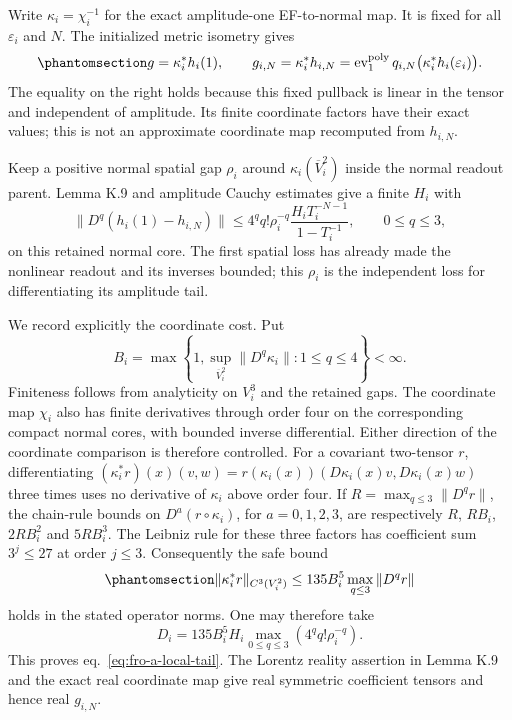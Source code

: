 \documentclass[
  english,
  11pt,
  reqno]{amsart}
\begin{document}
Write \(\kappa_i=\chi_i^{-1}\) for the exact amplitude-one EF-to-normal
map. It is fixed for all \(\varepsilon_i\) and \(N\). The initialized
metric isometry gives
\begin{equation}\protect\phantomsection\label{eq:fro-a-fixed-coordinate-readout}{
 g=\kappa_i^*h_i(1),\qquad
 g_{i,N}
   =\kappa_i^*h_{i,N}
   =\operatorname{ev}^{\mathrm{poly}}_1
                      q_{i,N}\bigl(\kappa_i^*h_i(\varepsilon_i)\bigr).
}\end{equation} The equality on the right holds because this fixed
pullback is linear in the tensor and independent of amplitude. Its
finite coordinate factors have their exact values; this is not an
approximate coordinate map recomputed from \(h_{i,N}\).

Keep a positive normal spatial gap \(\rho_i\) around
\(\kappa_i(\overline V_i^2)\) inside the normal readout parent. Lemma
K.9 and amplitude Cauchy estimates give a finite \(H_i\) with \[
 \|D^q(h_i(1)-h_{i,N})\|
 \le 4^q q!\rho_i^{-q}
                  \frac{H_iT_i^{-N-1}}{1-T_i^{-1}},
 \qquad 0\le q\le3,
\] on this retained normal core. The first spatial loss has already made
the nonlinear readout and its inverses bounded; this \(\rho_i\) is the
independent loss for differentiating its amplitude tail.

We record explicitly the coordinate cost. Put \[
 B_i=\max\left\{1,\sup_{\overline V_i^2}
                           \|D^q\kappa_i\|:1\le q\le4\right\}<\infty.
\] Finiteness follows from analyticity on \(V_i^3\) and the retained
gaps. The coordinate map \(\chi_i\) also has finite derivatives through
order four on the corresponding compact normal cores, with bounded
inverse differential. Either direction of the coordinate comparison is
therefore controlled. For a covariant two-tensor \(r\), differentiating
\((\kappa_i^*r)(x)(v,w)
=r(\kappa_i(x))(D\kappa_i(x)v,D\kappa_i(x)w)\) three times uses no
derivative of \(\kappa_i\) above order four. If
\(R=\max_{q\le3}\|D^qr\|\), the chain-rule bounds on
\(D^a(r\circ\kappa_i)\), for \(a=0,1,2,3\), are respectively \(R\),
\(RB_i\), \(2RB_i^2\) and \(5RB_i^3\). The Leibniz rule for these three
factors has coefficient sum \(3^j\le27\) at order \(j\le3\).
Consequently the safe bound
\begin{equation}\protect\phantomsection\label{eq:fro-a-coordinate-c4-cost}{
 \|\kappa_i^*r\|_{C^3(V_i^2)}
       \le135B_i^5
                    \max_{q\le3}\|D^qr\|
}\end{equation} holds in the stated operator norms. One may therefore
take \[
 D_i=135B_i^5H_i
              \max_{0\le q\le3}(4^q q!\rho_i^{-q}).
\] This proves eq.~\ref{eq:fro-a-local-tail}. The Lorentz reality
assertion in Lemma K.9 and the exact real coordinate map give real
symmetric coefficient tensors and hence real \(g_{i,N}\).
\end{document}
